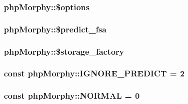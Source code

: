 \hypertarget{classphpMorphy_a473b5901c47b7aa079e27d24d3da07af}{
\subsubsection[{\$options}]{\setlength{\rightskip}{0pt plus 5cm}phpMorphy::\$options}}
\label{classphpMorphy_a473b5901c47b7aa079e27d24d3da07af}
\hypertarget{classphpMorphy_a1c65e7268298d0c2a800fb5db637dce5}{
\subsubsection[{\$predict\_\-fsa}]{\setlength{\rightskip}{0pt plus 5cm}phpMorphy::\$predict\_\-fsa}}
\label{classphpMorphy_a1c65e7268298d0c2a800fb5db637dce5}
\hypertarget{classphpMorphy_aeefc33700147a976cd183c09aaef36e2}{
\subsubsection[{\$storage\_\-factory}]{\setlength{\rightskip}{0pt plus 5cm}phpMorphy::\$storage\_\-factory}}
\label{classphpMorphy_aeefc33700147a976cd183c09aaef36e2}
\hypertarget{classphpMorphy_a96773a087cbcf69f52e1cddad0060c3d}{
\subsubsection[{IGNORE\_\-PREDICT}]{\setlength{\rightskip}{0pt plus 5cm}const {\bf phpMorphy::IGNORE\_\-PREDICT} = 2}}
\label{classphpMorphy_a96773a087cbcf69f52e1cddad0060c3d}
\hypertarget{classphpMorphy_a8cfde1e320c3114a46b5a250cfa2c368}{
\subsubsection[{NORMAL}]{\setlength{\rightskip}{0pt plus 5cm}const {\bf phpMorphy::NORMAL} = 0}}
